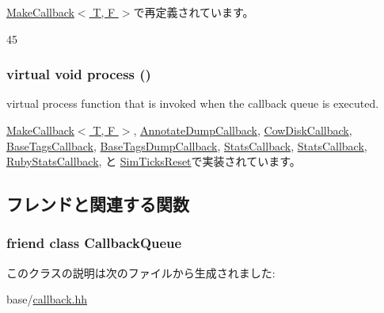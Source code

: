 \hyperlink{classMakeCallback_ad57c93dcd984e5a596eb4a3f4236c93a}{MakeCallback$<$ T, F $>$}で再定義されています。


\begin{DoxyCode}
45 {}
\end{DoxyCode}
\hypertarget{classCallback_a142b75b68a6291400e20fb0dd905b1c8}{
\subsubsection[{process}]{\setlength{\rightskip}{0pt plus 5cm}virtual void process ()}}
\label{classCallback_a142b75b68a6291400e20fb0dd905b1c8}
virtual process function that is invoked when the callback queue is executed. 

\hyperlink{classMakeCallback_a2e9c5136d19b1a95fc427e0852deab5c}{MakeCallback$<$ T, F $>$}, \hyperlink{classAnnotateDumpCallback_a2e9c5136d19b1a95fc427e0852deab5c}{AnnotateDumpCallback}, \hyperlink{classCowDiskCallback_a2e9c5136d19b1a95fc427e0852deab5c}{CowDiskCallback}, \hyperlink{classBaseTagsCallback_a6780fc1879338e1ff38faf7279ec6a0b}{BaseTagsCallback}, \hyperlink{classBaseTagsDumpCallback_a6780fc1879338e1ff38faf7279ec6a0b}{BaseTagsDumpCallback}, \hyperlink{classNetwork_1_1StatsCallback_a2e9c5136d19b1a95fc427e0852deab5c}{StatsCallback}, \hyperlink{classAbstractController_1_1StatsCallback_a2e9c5136d19b1a95fc427e0852deab5c}{StatsCallback}, \hyperlink{classRubyStatsCallback_a2e9c5136d19b1a95fc427e0852deab5c}{RubyStatsCallback}, と \hyperlink{structStats_1_1SimTicksReset_a2e9c5136d19b1a95fc427e0852deab5c}{SimTicksReset}で実装されています。

\subsection{フレンドと関連する関数}
\hypertarget{classCallback_a49078cbddf43eb933f0b6de2fd77c97d}{
\subsubsection[{CallbackQueue}]{\setlength{\rightskip}{0pt plus 5cm}friend class {\bf CallbackQueue}}}
\label{classCallback_a49078cbddf43eb933f0b6de2fd77c97d}


このクラスの説明は次のファイルから生成されました:\begin{DoxyCompactItemize}
\item 
base/\hyperlink{callback_8hh}{callback.hh}\end{DoxyCompactItemize}
